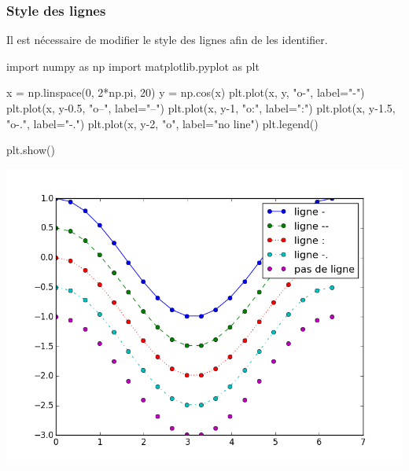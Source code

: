 \begin{frame}[fragile]
\frametitle{Style des lignes}

Il est nécessaire de modifier le style des lignes afin de les identifier.

\begin{minipage}{0.6\linewidth}
\begin{GrayBox}[0.85\textwidth]
\begin{verbatimtab}[3]
import numpy as np
import matplotlib.pyplot as plt

x = np.linspace(0, 2*np.pi, 20)
y = np.cos(x)
plt.plot(x, y, "o-", label="-")
plt.plot(x, y-0.5, "o--", label="--")
plt.plot(x, y-1, "o:", label=":")
plt.plot(x, y-1.5, "o-.", label="-.")
plt.plot(x, y-2, "o", label="no line")
plt.legend()

plt.show()
\end{verbatimtab}
\end{GrayBox}
\end{minipage}\hfill
\begin{minipage}{0.36\linewidth}
\begin{center}
 \includegraphics[width=1\linewidth]{img/courbe4}
\end{center}
\end{minipage}

\end{frame}

